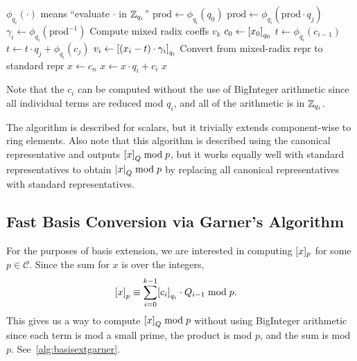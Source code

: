 \documentclass[../../fheimpl.tex]{subfiles}
\begin{document}
\begin{algorithm}
	\caption{Garner's Algorithm}\label{alg:garnersalg}
	\begin{algorithmic}[1]
		\State \Comment $\phi_{q_i}(\cdot)$ means ``evaluate $\cdot$ in $\Z_{q_i}$''
			\State $\textrm{prod} \gets \phi_{q_i}(q_0)$
				\State $\textrm{prod} \gets \phi_{q_i}(\textrm{prod}\cdot q_j)$
			\EndFor
			\State $\gamma_i\gets \phi_{q_i}(\textrm{prod}^{-1})$
		\EndFor
		\State \Comment Compute mixed radix coeffs ${v_k}$
		\State $c_0\gets \bracks*{x_0}_{q_0}$
			\State $t \gets \phi_{q_i}(c_{i-1})$
				\State $t\gets t\cdot q_j+\phi_{q_i}(c_j)$
			\EndFor
			\State $v_i\gets\bracks*{(x_i-t)\cdot \gamma_i}_{q_i}$
		\EndFor
		\State \Comment Convert from mixed-radix repr to standard repr
		\State $x\gets c_n$
			\State $x\gets x\cdot q_i + c_i$
		\EndFor
		\Return $x$
		\EndProcedure
	\end{algorithmic}
\end{algorithm}

Note that the $c_i$ can be computed without the use of BigInteger arithmetic since all individual terms are reduced mod $q_i$, and all of the arithmetic is in $\Z_{q_i}$.

The algorithm is described for scalars, but it trivially extends component-wise to ring elements. Also note that this algorithm is described using the canonical representative and outputs $\bracks*{x}_Q\bmod p$, but it works equally well with standard representatives to obtain $\abs*{x}_Q\bmod p$ by replacing all canonical representatives with standard representatives.

\subsection{Fast Basis Conversion via Garner's Algorithm}
\label{sec:fastextension}

For the purposes of basis extension, we are interested in computing $\bracks{x}_p$ for some $p\in\mathcal{C}$. Since the sum for $x$ is over the integers, 
\begin{align*}
	\bracks*{x}_p &\equiv \sum_{i=0}^{k-1} \bracks*{c_i}_{q_i}\cdot Q_{i-1} \bmod p.
\end{align*}
This gives us a way to compute $\bracks*{x}_Q\bmod p$ without using BigInteger arithmetic since each term is mod a small prime, the product is mod $p$, and the sum is mod $p$. See~\cref{alg:basisextgarner}.
\end{document}
